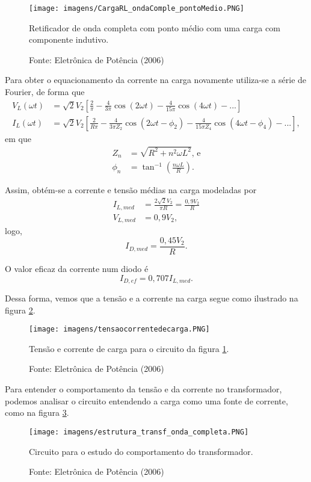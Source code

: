 \begin{figure}[ht]
\center
\texttt{[image: imagens/CargaRL\_ondaComple\_pontoMedio.PNG]}
\caption{Retificador de onda completa com ponto médio com uma carga com componente indutivo.}\label{fig:ROCACI}
\caption*{Fonte: Eletrônica de Potência (2006)}
\end{figure}

Para obter o equacionamento da corrente na carga novamente utiliza-se a série de Fourier, de forma que
\begin{align*}
    V_{L}(\omega{t}) &= \sqrt{2}V_2[{\frac{2}{\pi}-\frac{4}{3\pi}{\cos({2\omega}{t})}} - \frac{4}{15\pi}{\cos(4{\omega}{t})} - ...] \\
    I_{L}(\omega{t}) &= \sqrt{2}V_2[{\frac{2}{R\pi}-\frac{4}{3\pi{Z_2}}{\cos({2\omega}{t}-\phi_2)}} - \frac{4}{15\pi{Z_4}}{\cos(4{\omega}{t}-\phi_4)} - ...]
,\end{align*}
em que
\begin{align*}
Z_n &= \sqrt{R^2 + {n^2}{\omega}{L^2}} \text{, e} \\
\phi_n &= \tan^{-1}(\frac{n{\omega}{L}}{R})
.\end{align*}

Assim, obtém-se a corrente e tensão médias na carga modeladas por
\begin{align*}
    I_{L,med} &= \frac{2\sqrt{2}{V_2}}{\pi{R}} = \frac{0,9 V_2}{R} \\
    V_{L,med} &= 0,9 V_2
,\end{align*}
logo, \[
I_{D,med} = \frac{0,45 V_2}{R}
.\] 

O valor eficaz da corrente num diodo é \[
I_{D,ef} = 0,707{I_{L,med}}
.\] 

Dessa forma, vemos que a tensão e a corrente na carga segue como ilustrado na figura \ref{fig:TCCROCACI}.

\begin{figure}[ht]
\center
\texttt{[image: imagens/tensaocorrentedecarga.PNG]}
\caption{Tensão e corrente de carga para o circuito da figura \ref{fig:ROCACI}.}\label{fig:TCCROCACI}
\caption*{Fonte: Eletrônica de Potência (2006)}
\end{figure}

Para entender o comportamento da tensão e da corrente no transformador, podemos analisar o circuito entendendo a carga como uma fonte de corrente, como na figura \ref{fig:ESTOC}.

\begin{figure}[ht]
\center
\texttt{[image: imagens/estrutura\_transf\_onda\_completa.PNG]}
\caption{Circuito para o estudo do comportamento do transformador.}\label{fig:ESTOC}
\caption*{Fonte: Eletrônica de Potência (2006)}
\end{figure}

